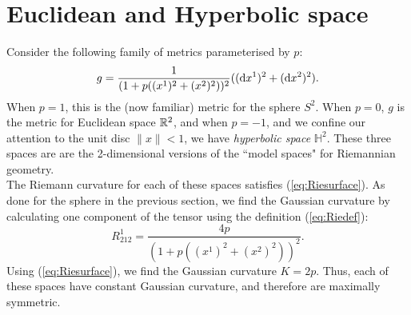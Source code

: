 
\section{Euclidean and Hyperbolic space}
Consider the following family of metrics parameterised by $p$:
\[ g=\frac{1}{(1+p((x^1)^2+(x^2)^2))^2}(({\mbox{d}} x^1)^2+({\mbox{d}} x^2)^2). \]
When $p=1$, this is the (now familiar) metric for the sphere $S^2$. When $p=0$, $g$ is the metric for Euclidean space ${\mathbb R}^2$, and when $p=-1$, and we confine our attention to the unit disc $\|x\|<1$, we have \textit{hyperbolic space} $\mathbb{H}^2$. These three spaces are are the 2-dimensional versions of the ``model spaces" for Riemannian geometry.\\

The Riemann curvature for each of these spaces satisfies (\ref{eq:Riesurface}). As done for the sphere in the previous section, we find the Gaussian curvature by calculating one component of the tensor using the definition (\ref{eq:Riedef}):
\[ R^1_{212} = \frac{4p}{(1+p((x^1)^2+(x^2)^2))^2}. \]
Using (\ref{eq:Riesurface}), we find the Gaussian curvature $K=2p$. Thus, each of these spaces have constant Gaussian curvature, and therefore are maximally symmetric. 

%